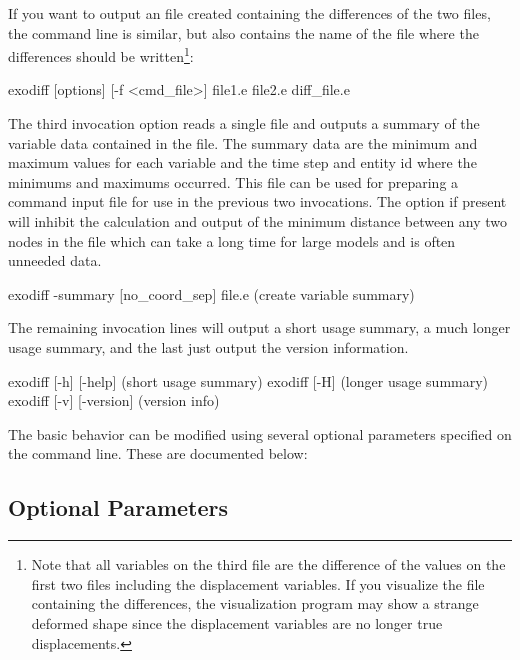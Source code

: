 If you want \exodiff{} to output an \exo{} file created containing the differences of the two
files, the command line is similar, but also contains the name of the
file where the differences should be written\footnote{Note that all
variables on the third file are the difference of the values on the
first two files including the displacement variables.  If you
visualize the file containing the differences, the visualization program may show a strange
deformed shape since the displacement variables are no longer true displacements.}:
\begin{syntax}
     exodiff [{options}] [-f <cmd\_file>] file1.e file2.e diff_file.e
\end{syntax}

The third invocation option reads a single file and outputs a summary
of the variable data contained in the file.  The summary data are the
minimum and maximum values for each variable and the time step and
entity id where the minimums and maximums occurred.  This file can be
used for preparing a command input file for use in the previous two
invocations.  The  option if present will
inhibit the calculation and output of the minimum distance between any
two nodes in the file which can take a long time for large models and
is often unneeded data.
\begin{syntax}
     exodiff -summary [no\_coord\_sep] file.e (create variable summary)  
\end{syntax}

The remaining invocation lines will output a short usage summary, a
much longer usage summary, and the last just output the version
information.

\begin{syntax}
     exodiff [-h] [-help]             (short usage summary) 
     exodiff [-H]                     (longer usage summary)
     exodiff [-v] [-version]          (version info)       
\end{syntax}

The basic behavior can be modified using several optional parameters
specified on the command line.  These are documented below:

\subsection{Optional Parameters}

